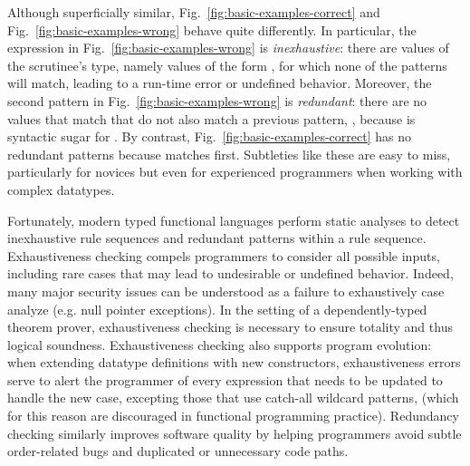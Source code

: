 Although superficially similar, Fig.~\ref{fig:basic-examples-correct} and Fig.~\ref{fig:basic-examples-wrong}
behave quite differently. In particular, the  expression in Fig.~\ref{fig:basic-examples-wrong} is \emph{inexhaustive}: there are values of the scrutinee's type, namely values of the form , for which none of the patterns will match, leading to a run-time error or undefined behavior. 
Moreover, the second pattern in Fig.~\ref{fig:basic-examples-wrong} is \emph{redundant}: there are no values that match  that do not also match a
previous pattern, , because \li{[x, y]} is syntactic sugar for .
By contrast, Fig.~\ref{fig:basic-examples-correct} has no redundant patterns because  matches first.
Subtleties like these are easy to miss, particularly for novices but even for experienced programmers when working with complex datatypes. 

Fortunately,
modern typed functional languages perform static analyses to detect inexhaustive rule sequences and redundant patterns within a rule sequence.
Exhaustiveness checking compels programmers to consider all possible inputs, including rare cases that may lead to undesirable or undefined behavior. Indeed, many major security issues can be understood as a failure to exhaustively case analyze (e.g. null pointer exceptions).
In the setting of a dependently-typed theorem prover, exhaustiveness checking is necessary to ensure totality and thus logical soundness.
Exhaustiveness checking also supports program evolution: when extending datatype definitions with new constructors, exhaustiveness errors 
serve to alert the programmer of every  expression that needs to be updated to handle the new case, excepting those that use catch-all wildcard patterns, \li{_} (which for this reason are discouraged in functional programming practice).
Redundancy checking similarly improves software quality by helping programmers avoid subtle order-related bugs and duplicated or unnecessary code paths.



